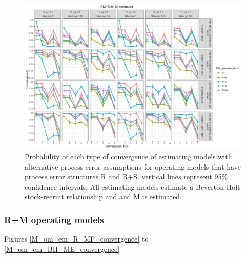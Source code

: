 \documentclass[
  12pt,
]{article}
\begin{document}
\begin{landscape}
\begin{figure}
\caption{Probability of each type of convergence of estimating models with alternative process error assumptions for operating models that have process error structures R and R+S. vertical lines represent 95\% confidence intervals. All estimating models estimate a Beverton-Holt stock-recruit relationship and and M is estimated.}\label{naa_om_em_BH_ME_convergence}
\begin{center}
\includegraphics[width = \textwidth]{naa_om_p_convergence_BH_M_estimated.png}
\end{center}
\end{figure}
\end{landscape}

\hypertarget{rm-operating-models}{%
\subsubsection*{R+M operating models}\label{rm-operating-models}}

Figures \ref{M_om_em_R_MF_convergence} to
\ref{M_om_em_BH_ME_convergence}
\end{document}
